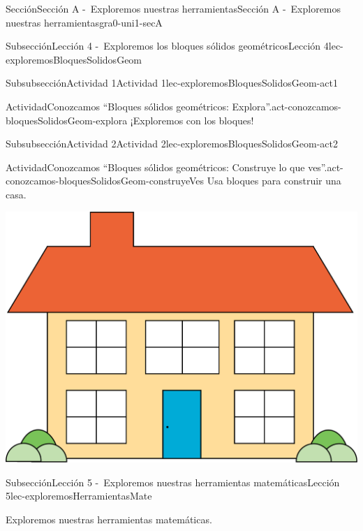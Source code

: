 \documentclass[twoside,10pt,]{article}
\begin{document}
\begin{sectionptx}{Sección}{Sección A -~Exploremos nuestras herramientas}{}{Sección A -~Exploremos nuestras herramientas}{}{}{gra0-uni1-secA}
\begin{subsectionptx}{Subsección}{Lección 4 -~Exploremos los bloques sólidos geométricos}{}{Lección 4}{}{}{lec-exploremosBloquesSolidosGeom}
\begin{subsubsectionptx}{Subsubsección}{Actividad 1}{}{Actividad 1}{}{}{lec-exploremosBloquesSolidosGeom-act1}
\begin{activity}{Actividad}{Conozcamos ``Bloques sólidos geométricos: Explora''.}{act-conozcamos-bloquesSolidosGeom-explora}%
¡Exploremos con los bloques!%
\end{activity}%
\end{subsubsectionptx}
%
%
\typeout{************************************************}
\typeout{************************************************}
%
\begin{subsubsectionptx}{Subsubsección}{Actividad 2}{}{Actividad 2}{}{}{lec-exploremosBloquesSolidosGeom-act2}
\begin{activity}{Actividad}{Conozcamos “Bloques sólidos geométricos: Construye lo que ves”.}{act-conozcamos-bloquesSolidosGeom-construyeVes}%
Usa bloques para construir una casa.%
\begin{image}{0}{1}{0}{}%
\includegraphics[width=\linewidth]{external/png-source/house.png}
\end{image}%
\end{activity}%
\end{subsubsectionptx}
\end{subsectionptx}
%
%
\typeout{************************************************}
\typeout{************************************************}
%
\begin{subsectionptx}{Subsección}{Lección 5 -~Exploremos nuestras herramientas matemáticas}{}{Lección 5}{}{}{lec-exploremosHerramientasMate}
\begin{introduction}{}%
Exploremos nuestras herramientas matemáticas.%
\end{introduction}%

\end{subsectionptx}
\end{sectionptx}
\end{document}
